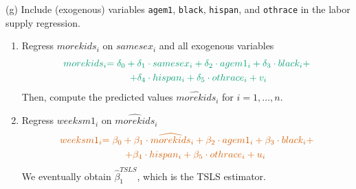 \documentclass[
  10pt,
  ignorenonframetext,
]{beamer}
\begin{document}
\begin{frame}{(g) Include (exogenous) variables \texttt{agem1},
\texttt{black}, \texttt{hispan}, and \texttt{othrace} in the labor
supply regression.}
\protect\hypertarget{g-include-exogenous-variables-agem1-black-hispan-and-othrace-in-the-labor-supply-regression.}{}
\begin{enumerate}
\item
  Regress \(morekids_i\) on \(samesex_i\) and all exogenous variables
  \begin{equation*}
  \begin{split}
  \color{green}{morekids_i} &\color{green}{= \delta_0 + \delta_1 \cdot samesex_i + \delta_2 \cdot agem1_i + \delta_3 \cdot black_i + }\\
  &\hspace{24pt} \color{green}{+ \delta_4 \cdot hispan_i + \delta_5 \cdot othrace_i + v_i}
  \end{split}
  \end{equation*} Then, compute the predicted values
  \(\widehat{morekids}_i\) for \(i = 1,\ldots,n.\)
\item
  Regress \(weeksm1_i\) on \(\widehat{morekids}_i\) \begin{equation*}
  \begin{split}
  \color{red}{weeksm1_i} &\color{red}{= \beta_0 + \beta_1 \cdot \widehat{morekids}_i + \beta_2 \cdot agem1_i + \beta_3 \cdot black_i + } \\ 
  &\hspace{24pt} \color{red}{+\beta_4 \cdot hispan_i + \beta_5 \cdot othrace_i + u_i}
  \end{split}
  \end{equation*} We eventually obtain \(\hat{\beta}_1^{TSLS}\), which
  is the TSLS estimator.
\end{enumerate}
\end{frame}
\end{document}
